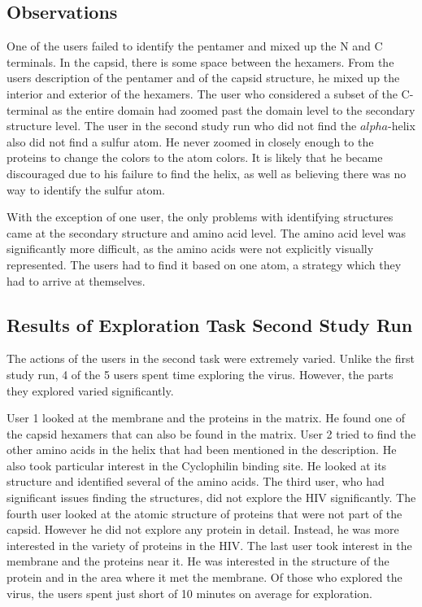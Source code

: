 \documentclass[review,journal]{vgtc}         %
\begin{document}
	
	\subsection{Observations}
	One of the users failed to identify the pentamer and mixed up the N and C terminals. 
	In the capsid, there is some space between the hexamers. 
	From the users description of the pentamer and of the capsid structure, he mixed up the interior and exterior of the hexamers. 
	The user who considered a subset of the C-terminal as the entire domain had zoomed past the domain level to the secondary structure level.
	The user in the second study run who did not find the $alpha$-helix also did not find a sulfur atom. He never zoomed in closely enough to the proteins to change the colors to the atom colors. It is likely that he became discouraged due to his failure to find the helix, as well as believing there was no way to identify the sulfur atom.
	
	With the exception of one user, the only problems with identifying structures came at the secondary structure and amino acid level. 
	The amino acid level was significantly more difficult, as the amino acids were not explicitly visually represented. 
	The users had to find it based on one atom, a strategy which they had to arrive at themselves. 
	
	
	
	\subsection{Results of Exploration Task Second Study Run}
	
	The actions of the users in the second task were extremely varied. 
	Unlike the first study run, 4 of the 5 users spent time exploring the virus. 
	However, the parts they explored varied significantly. 
	
	User 1 looked at the membrane and the proteins in the matrix. 
	He found one of the capsid hexamers that can also be found in the matrix.
	User 2 tried to find the other amino acids in the helix that had been mentioned in the description. 
	He also took particular interest in the Cyclophilin binding site. 
	He looked at its structure and identified several of the amino acids.
	The third user, who had significant issues finding the structures, did not explore the HIV significantly.
	The fourth user looked at the atomic structure of proteins that were not part of the capsid.
	However he did not explore any protein in detail. 
	Instead, he was more interested in the variety of proteins in the HIV.
	The last user took interest in the membrane and the proteins near it.
	He was interested in the structure of the protein and in the area where it met the membrane.
	Of those who explored the virus, the users spent just short of 10 minutes on average for exploration.
	
\end{document}
